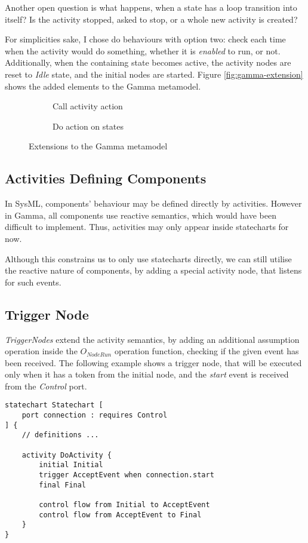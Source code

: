 Another open question is what happens, when a state has a loop transition into itself? Is the activity stopped, asked to stop, or a whole new activity is created?

For simplicities sake, I chose do behaviours with option two: check each time when the activity would do something, whether it is \emph{enabled} to run, or not. Additionally, when the containing state becomes active, the activity nodes are reset to \emph{Idle} state, and the initial nodes are started. Figure \autoref{fig:gamma-extension} shows the added elements to the Gamma metamodel.


\begin{figure}[!ht]
	\begin{subfigure}{.66\textwidth}
		\centering
		
		\caption{Call activity action}
	\end{subfigure}%
	\begin{subfigure}{.33\textwidth}
		\centering
		
		\caption{Do action on states}
	\end{subfigure}
	\caption{Extensions to the Gamma metamodel}
	\label{fig:gamma-extension}
\end{figure}

\subsection{Activities Defining Components}

In SysML, components' behaviour may be defined directly by activities. However in Gamma, all components use reactive semantics, which would have been difficult to implement. Thus, activities may only appear inside statecharts for now.

Although this constrains us to only use statecharts directly, we can still utilise the reactive nature of components, by adding a special activity node, that listens for such events.

\subsection{Trigger Node}

\emph{TriggerNodes} extend the activity semantics, by adding an additional assumption operation inside the \(	O_\mathit{NodeRun}\) operation function, checking if the given event has been received. The following example shows a trigger node, that will be executed only when it has a token from the initial node, and the \emph{start} event is received from the \emph{Control} port.
\vspace{6mm}
\begin{lstlisting}[language=statechart, linewidth=0.75\textwidth, xleftmargin=0.25\textwidth]
statechart Statechart [
	port connection : requires Control
] {
	// definitions ...
	
	activity DoActivity {
		initial Initial
		trigger AcceptEvent when connection.start
		final Final
		
		control flow from Initial to AcceptEvent
		control flow from AcceptEvent to Final
	}
}
\end{lstlisting}
